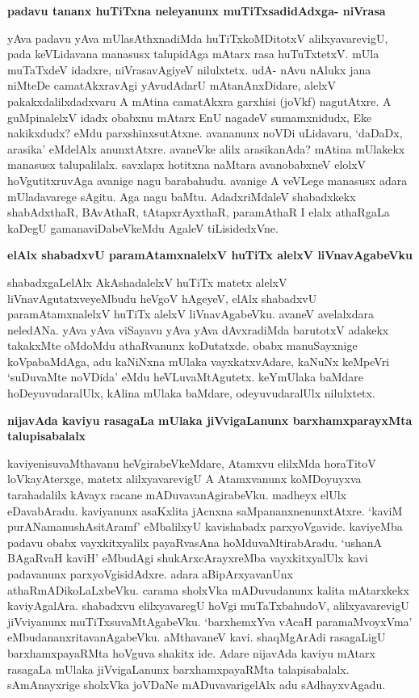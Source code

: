 {\bigskip
\noindent
{\large\bf padavu tananx huTiTxna neleyanunx muTiTxsadidAdxga- niVrasa}}\label{page182}
\medskip

\noindent
yAva padavu yAva mUlasAthxnadiMda huTiTxkoMDitotxV alilxyavarevigU, pada keVLidavana manasusx talupidAga mAtarx rasa huTuTxtetxV. mUla muTaTxdeV idadxre, niVrasavAgiyeV nilulxtetx. udA- nAvu nAlukx jana niMteDe camatAkxravAgi yAvudAdarU mAtanAnxDidare, alelxV pakakxdalilxdadxvaru A mAtina camatAkxra garxhisi (joVkf) nagutAtxre. A guMpinalelxV idadx obabxnu mAtarx EnU nagadeV sumamxnidudx, Eke nakikxdudx? eMdu parxshinxsutAtxne. avananunx noVDi uLidavaru, `daDaDx, arasika' eMdelAlx anunxtAtxre. avaneVke alilx arasikanAda? mAtina mUlakekx manasusx talupalilalx. savxlapx hotitxna naMtara avanobabxneV elolxV hoVgutitxruvAga avanige nagu barabahudu. avanige A veVLege manasusx adara mUladavarege sAgitu. Aga nagu baMtu. AdadxriMdaleV shabadxkekx shabAdxthaR, BAvAthaR, tAtapxrAyxthaR, paramAthaR I elalx athaRgaLa kaDegU gamanaviDabeVkeMdu AgaleV tiLisidedxVne.

{\bigskip
\noindent
{\large\bf elAlx shabadxvU paramAtamxnalelxV huTiTx alelxV liVnavAgabeVku}}\label{page182a}
\medskip

\noindent
shabadxgaLelAlx AkAshadalelxV huTiTx matetx alelxV liVnavAgutatxveyeMbudu heVgoV hAgeyeV, elAlx shabadxvU paramAtamxnalelxV huTiTx alelxV liVnavAgabeVku. avaneV avelalxdara neledANa. yAva yAva viSayavu yAva yAva dAvxradiMda barutotxV adakekx takakxMte oMdoMdu athaRvanunx koDutatxde. obabx manuSayxnige koVpabaMdAga, adu kaNiNxna mUlaka vayxkatxvAdare, kaNuNx keMpeVri `suDuvaMte noVDida' eMdu heVLuvaMtAgutetx. keYmUlaka baMdare hoDeyuvudaralUlx, kAlina mUlaka baMdare, odeyuvudaralUlx nilulxtetx. 

{\bigskip
\noindent
{\large\bf nijavAda kaviyu rasagaLa mUlaka jiVvigaLanunx barxhamxparayxMta talupisabalalx}}\label{page183}
\medskip

\noindent
kaviyenisuvaMthavanu heVgirabeVkeMdare, Atamxvu elilxMda horaTitoV loVkayAterxge, matetx alilxyavarevigU A Atamxvanunx koMDoyuyxva tarahadalilx kAvayx racane mADuvavanAgirabeVku. madheyx elUlx eDavabAradu. kaviyanunx asaKxlita jAcnxna saMpananxnenunxtAtxre. `kaviM purANamanushAsitAramf'\label{239} eMbalilxyU kavishabadx parxyoVgavide. kaviyeMba padavu obabx vayxkitxyalilx payaRvasAna hoMduvaMtirabAradu. `ushanA BAgaRvaH kaviH' eMbudAgi shukArxcArayxreMba vayxkitxyalUlx kavi padavanunx parxyoVgisidAdxre. adara aBipArxyavanUnx athaRmADikoLaLxbeVku. carama sholxVka mADuvudanunx kalita mAtarxkekx kaviyAgalAra. shabadxvu elilxyavaregU hoVgi muTaTxbahudoV, alilxyavarevigU jiVviyanunx muTiTxsuvaMtAgabeVku. `barxhemxYva vAcaH paramaMvoyxVma'\label{183} eMbudananxritavanAgabeVku. aMthavaneV kavi. shaqMgArAdi rasagaLigU barxhamxpayaRMta hoVguva shakitx ide. Adare nijavAda kaviyu mAtarx rasagaLa mUlaka jiVvigaLanunx barxhamxpayaRMta talapisabalalx. sAmAnayxrige sholxVka joVDaNe mADuvavarigelAlx adu sAdhayxvAgadu.

